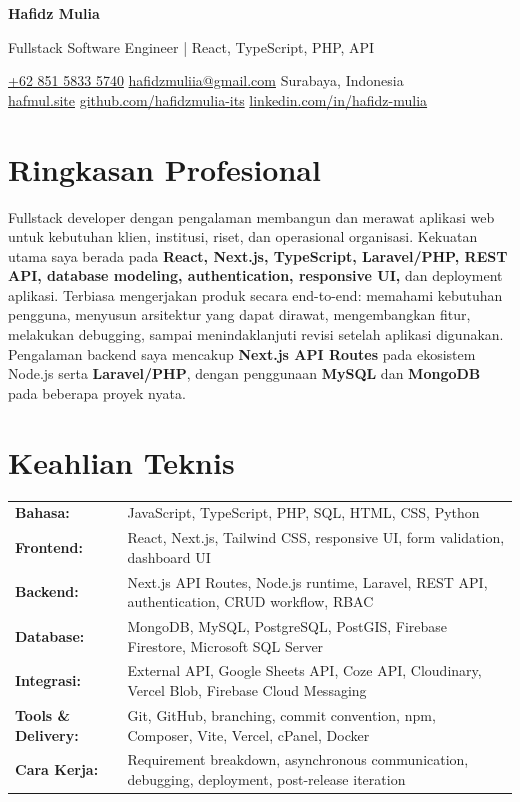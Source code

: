 \documentclass[a4paper,11pt]{article}
\newcommand{\cvname}[1]{%
  {\centering\LARGE\bfseries #1\par\vspace{2pt}}%
}
\newcommand{\cvtitle}[1]{%
  {\centering\large\color{accent} #1\par\vspace{4pt}}%
}
\newcommand{\cvcontact}[1]{%
  {\centering\small #1\par\vspace{6pt}}%
}
\begin{document}
\cvname{Hafidz Mulia}
\cvtitle{Fullstack Software Engineer | React, TypeScript, PHP, API}
\cvcontact{%
  \href{tel:+6285158335740}{+62 851 5833 5740} \quad\textbar\quad
  \href{mailto:hafidzmuliia@gmail.com}{hafidzmuliia@gmail.com} \quad\textbar\quad
  Surabaya, Indonesia \\
  \href{https://hafmul.site}{hafmul.site} \quad\textbar\quad
  \href{https://github.com/hafidzmulia-its}{github.com/hafidzmulia-its} \quad\textbar\quad
  \href{https://www.linkedin.com/in/hafidz-mulia/}{linkedin.com/in/hafidz-mulia}
}

\section{Ringkasan Profesional}
Fullstack developer dengan pengalaman membangun dan merawat aplikasi web untuk kebutuhan klien, institusi, riset, dan operasional organisasi. Kekuatan utama saya berada pada \textbf{React, Next.js, TypeScript, Laravel/PHP, REST API, database modeling, authentication, responsive UI,} dan deployment aplikasi. Terbiasa mengerjakan produk secara end-to-end: memahami kebutuhan pengguna, menyusun arsitektur yang dapat dirawat, mengembangkan fitur, melakukan debugging, sampai menindaklanjuti revisi setelah aplikasi digunakan. Pengalaman backend saya mencakup \textbf{Next.js API Routes} pada ekosistem Node.js serta \textbf{Laravel/PHP}, dengan penggunaan \textbf{MySQL} dan \textbf{MongoDB} pada beberapa proyek nyata.

\section{Keahlian Teknis}
\begin{tabularx}{\textwidth}{@{}l X@{}}
\textbf{Bahasa:} & JavaScript, TypeScript, PHP, SQL, HTML, CSS, Python \\[3pt]
\textbf{Frontend:} & React, Next.js, Tailwind CSS, responsive UI, form validation, dashboard UI \\[3pt]
\textbf{Backend:} & Next.js API Routes, Node.js runtime, Laravel, REST API, authentication, CRUD workflow, RBAC \\[3pt]
\textbf{Database:} & MongoDB, MySQL, PostgreSQL, PostGIS, Firebase Firestore, Microsoft SQL Server \\[3pt]
\textbf{Integrasi:} & External API, Google Sheets API, Coze API, Cloudinary, Vercel Blob, Firebase Cloud Messaging \\[3pt]
\textbf{Tools \& Delivery:} & Git, GitHub, branching, commit convention, npm, Composer, Vite, Vercel, cPanel, Docker \\[3pt]
\textbf{Cara Kerja:} & Requirement breakdown, asynchronous communication, debugging, deployment, post-release iteration \\
\end{tabularx}
\end{document}
